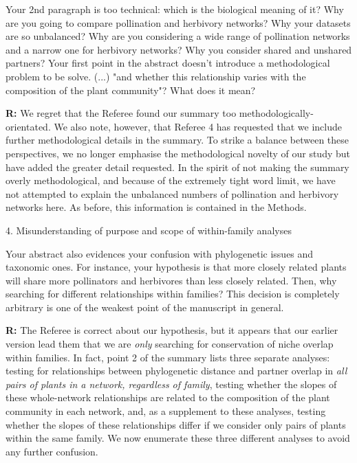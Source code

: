 \documentclass[12pt]{letter}
\newenvironment{refquote}{\bigskip \begin{it}}{\end{it}\smallskip}
\begin{document}
		\begin{refquote}
			Your 2nd paragraph is too technical: which is the biological meaning of it? Why are you going to compare pollination and herbivory networks? Why your datasets are so unbalanced? Why are you considering a wide range of pollination networks and a narrow one for herbivory networks? Why you consider shared and unshared partners? Your first point in the abstract doesn't introduce a methodological problem to be solve. (...) "and whether this relationship varies with the composition of the plant community"? What does it mean?
		\end{refquote}


		\textbf{R:} We regret that the Referee found our summary too methodologically-orientated. We also note, however, that Referee 4 has requested that we include further methodological details in the summary. To strike a balance between these perspectives, we no longer emphasise the methodological novelty of our study but have added the greater detail requested. In the spirit of not making the summary overly methodological, and because of the extremely tight word limit, we have not attempted to explain the unbalanced numbers of pollination and herbivory networks here. As before, this information is contained in the Methods. 


	4. Misunderstanding of purpose and scope of within-family analyses 

		\begin{refquote}
		Your abstract also evidences your confusion with phylogenetic issues and taxonomic ones. For instance, your hypothesis is that more closely related plants will share more pollinators and herbivores than less closely related. Then, why searching for different relationships within families? This decision is completely arbitrary is one of the weakest point of the manuscript in general.
		\end{refquote}


		\textbf{R:} The Referee is correct about our hypothesis, but it appears that our earlier version lead them that we are \emph{only} searching for conservation of niche overlap within families. In fact, point 2 of the summary lists three separate analyses: testing for relationships between phylogenetic distance and partner overlap in \emph{all pairs of plants in a network, regardless of family}, testing whether the slopes of these whole-network relationships are related to the composition of the plant community in each network, and, as a supplement to these analyses, testing whether the slopes of these relationships differ if we consider only pairs of plants within the same family. We now enumerate these three different analyses to avoid any further confusion. 
\end{document}
